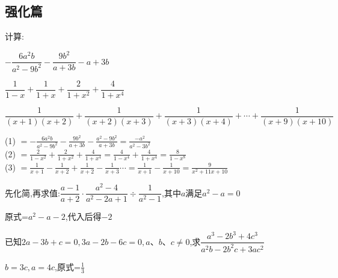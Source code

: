 \documentclass[cn,blue,12pt]{elegantbook}
\begin{document}
\subsection{强化篇}%
\begin{xiti}[resume]
    \setlength{\itemsep}{4.5ex}
\item 计算:
    \begin{xiti}[resume]
        \setlength{\itemsep}{4.5ex}
    \item \(-\dfrac{6a^2b}{a^2-9b^2}-\dfrac{9b^2}{a+3b}-a+3b\)
    \item \(\dfrac{1}{1-x}+\dfrac{1}{1+x}+\dfrac{2}{1+x^2}+\dfrac{4}{1+x^4}\)
    \item \(\dfrac{1}{(x+1)(x+2)}+\dfrac{1}{(x+2)(x+3)}+\dfrac{1}{(x+3)(x+4)}+\cdots+\dfrac{1}{(x+9)(x+10)}\)
    \end{xiti}
\begin{solution}
        (1) \(=-\frac{6a^2b}{a^2-9b^2}-\frac{9b^2}{a+3b}-\frac{a^2-9b^2}{a+3b}=\frac{-a^2}{a^2-3b^2}\)\\
        (2) \(=\frac{2}{1-x^2}+\frac{2}{1+x^2}+\frac{4}{1+x^4}=\frac{4}{1-x^4}+\frac{4}{1+x^4}=\frac{8}{1-x^8}\)\\
        (3) \(=\frac{1}{x+1}-\frac{1}{x+2}+\frac{1}{x+2}-\frac{1}{x+3}\cdots=\frac{1}{x+1}-\frac{1}{x+10}=\frac{9}{x^2+11x+10}\)
\end{solution}
\item 先化简,再求值:\(\dfrac{a-1}{a+2}\cdot \dfrac{a^2-4}{a^2-2a+1}\div \dfrac{1}{a^2-1}\),其中\(a\)满足\(a^2-a=0\)
\begin{solution}
        原式=\(a^2-a-2\),代入后得\(-2\)
\end{solution}
\item 已知\(2a-3b+c=0,3a-2b-6c=0,a、b、c\ne 0\),求\(\dfrac{a^3-2b^3+4c^3}{a^2b-2b^2c+3ac^2}\)
\begin{solution}
        \(b=3c,a=4c\),原式=\(\frac{1}{3}\)
\end{solution}
\end{xiti}
\end{document}
